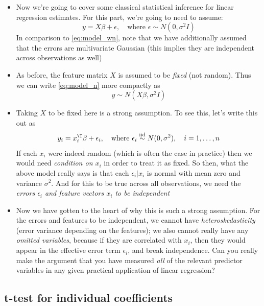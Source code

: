 \documentclass{article}
\begin{document}
\begin{itemize}
\item Now we're going to cover some classical statistical inference for linear
  regression estimates. For this part, we're going to need to assume:
  \begin{equation}
  \label{eq:model_n}
  y = X \beta + \epsilon, \quad \text{where $\epsilon \sim N(0, \sigma^2 I)$}
  \end{equation}
  In comparison to \eqref{eq:model_wn}, note that we have additionally assumed
  that the errors are multivariate Gaussian (this implies they are independent
  across observations as well)

\item As before, the feature matrix $X$ is assumed to  be \emph{fixed} (not
  random). Thus we can write \eqref{eq:model_n} more compactly as  
  \[
  y \sim N(X \beta, \sigma^2 I)
  \]

\item Taking $X$ to be fixed here is a strong assumption. To see this, let's
  write this out as 
  \[
  y_i = x_i^\T \beta + \epsilon_i, \quad \text{where $\epsilon_i \iidsim N(0,  
  \sigma^2)$}, \quad i=1,\dots,n
  \]
  If each $x_i$ were indeed random (which is often the case in practice) then we
  would need \emph{condition on $x_i$} in order to treat it as fixed. So then,
  what the above model really says is that each $\epsilon_i | x_i$ is normal
  with mean zero and variance $\sigma^2$. And for this to be true across all 
  observations, we need the \emph{errors $\epsilon_i$ and feature vectors $x_i$
    to be independent}

\item Now we have gotten to the heart of why this is such a strong
  assumption. For the errors and features to be independent, we cannot have
  \emph{heteroskedasticity} (error variance depending on the features); we also
  cannot really have any \emph{omitted variables}, because if they are
  correlated with $x_i$, then they would appear in the effective error term
  $\epsilon_i$, and break independence. Can you really make the argument that
  you have measured \emph{all} of the relevant predictor variables in any given 
  practical application of linear regression? 
\end{itemize}

\subsection{t-test for individual coefficients}
\end{document}
